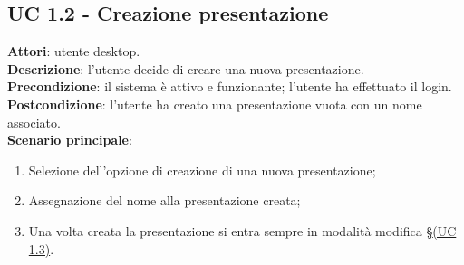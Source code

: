 \subsection{UC 1.2 - Creazione presentazione}{
	\label{uc1.2}
	\textbf{Attori}: utente desktop.	\\
	\textbf{Descrizione}: l'utente decide di creare una nuova presentazione.	\\
	\textbf{Precondizione}: il sistema è attivo e funzionante; l'utente ha effettuato il login.	\\
	\textbf{Postcondizione}: l'utente ha creato una presentazione vuota con un nome associato.	\\
	\textbf{Scenario principale}:
	\begin{enumerate}
		\item Selezione dell'opzione di creazione di una nuova presentazione;
		\item Assegnazione del nome alla presentazione creata;
		\item Una volta creata la presentazione si entra sempre in modalità modifica \S\hyperref[uc1.3]{(UC 1.3)}.
	\end{enumerate}
	}
